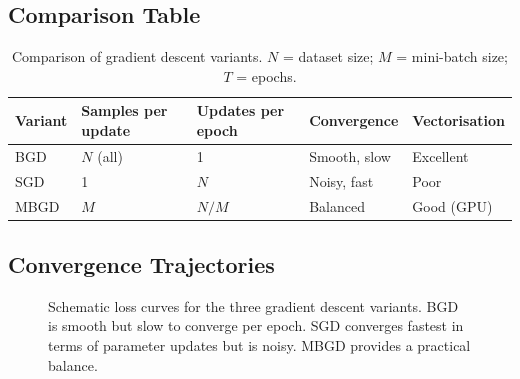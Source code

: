 \documentclass[12pt,a4paper]{article}
\newcommand{\Loss}{\mathcal{L}}
\begin{document}
\subsection{Comparison Table}

\begin{table}[ht]
\centering
\caption{Comparison of gradient descent variants.
         $N$ = dataset size; $M$ = mini-batch size; $T$ = epochs.}
\label{tab:gd-comparison}
\begin{tabularx}{\linewidth}{lXXXX}
\toprule
\textbf{Variant} &
\textbf{Samples per update} &
\textbf{Updates per epoch} &
\textbf{Convergence} &
\textbf{Vectorisation} \\
\midrule
BGD  & $N$ (all) & 1         & Smooth, slow  & Excellent \\
SGD  & 1         & $N$       & Noisy, fast   & Poor      \\
MBGD & $M$       & $N/M$     & Balanced      & Good (GPU)\\
\bottomrule
\end{tabularx}
\end{table}

\subsection{Convergence Trajectories}

\begin{figure}[ht]
\centering
{}
\caption{Schematic loss curves for the three gradient descent variants.
         BGD is smooth but slow to converge per epoch.
         SGD converges fastest in terms of parameter updates but is noisy.
         MBGD provides a practical balance.}
\label{fig:loss-curves}
\end{figure}
\end{document}
